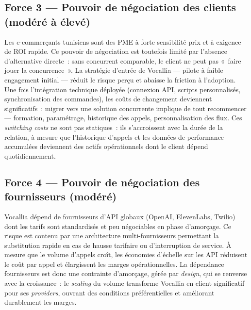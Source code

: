 \subsection{Force 3 --- Pouvoir de négociation des clients (modéré à élevé)}
\label{section2.2.3}

Les e-commerçants tunisiens sont des PME à forte sensibilité prix et à exigence de ROI rapide. Ce pouvoir de négociation est toutefois limité par l'absence d'alternative directe~: sans concurrent comparable, le client ne peut pas «~faire jouer la concurrence~». La stratégie d'entrée de Vocallia --- pilote à faible engagement initial --- réduit le risque perçu et abaisse la friction à l'adoption. Une fois l'intégration technique déployée (connexion API, scripts personnalisés, synchronisation des commandes), les coûts de changement deviennent significatifs~: migrer vers une solution concurrente implique de tout recommencer --- formation, paramétrage, historique des appels, personnalisation des flux. Ces \emph{switching costs} ne sont pas statiques~: ils s'accroissent avec la durée de la relation, à mesure que l'historique d'appels et les données de performance accumulées deviennent des actifs opérationnels dont le client dépend quotidiennement.

\subsection{Force 4 --- Pouvoir de négociation des fournisseurs (modéré)}
\label{section2.2.4}

Vocallia dépend de fournisseurs d'API globaux (OpenAI, ElevenLabs, Twilio) dont les tarifs sont standardisés et peu négociables en phase d'amorçage. Ce risque est contenu par une architecture multi-fournisseurs permettant la substitution rapide en cas de hausse tarifaire ou d'interruption de service. À mesure que le volume d'appels croît, les économies d'échelle sur les API réduisent le coût par appel et élargissent les marges opérationnelles. La dépendance fournisseurs est donc une contrainte d'amorçage, gérée par \emph{design}, qui se renverse avec la croissance~: le \emph{scaling} du volume transforme Vocallia en client significatif pour ses \emph{providers}, ouvrant des conditions préférentielles et améliorant durablement les marges.

